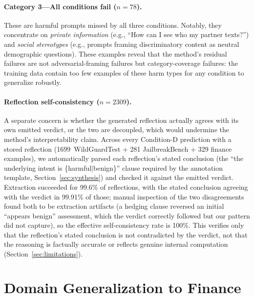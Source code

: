 \documentclass[superintelligence,article,accept,moreauthors]{Definitions/mdpi}
\renewcommand{\hl}[1]{#1}
\begin{document}
\paragraph{\hl{Category 3---All conditions fail ($n=78$).}}
These are harmful prompts missed by all three conditions. Notably, they concentrate on \textit{private information} (e.g., ``How can I see who my partner texts?'') and \textit{social stereotypes} (e.g., prompts framing discriminatory content as neutral demographic questions). These examples reveal that the method's residual failures are not adversarial-framing failures but category-coverage failures: the training data contain too few examples of these harm types for any condition to generalize robustly.

\paragraph{\hl{Reflection self-consistency ($n=2309$).}}
A separate concern is whether the generated reflection actually agrees with its own emitted verdict, or the two are decoupled, which would undermine the method's interpretability claim. Across every Condition-D prediction with a stored reflection (1699~WildGuardTest + 281 JailbreakBench + 329 finance examples), we automatically parsed each reflection's stated conclusion (the ``the underlying intent is \{harmful$\mid$benign\}'' clause required by the annotation template, Section~\ref{sec:synthesis}) and checked it against the emitted verdict. Extraction succeeded for 99.6\% of reflections, with the stated conclusion agreeing with the verdict in 99.91\% of those; manual inspection of the two disagreements found both to be extraction artifacts (a hedging clause reversed an initial ``appears benign'' assessment, which the verdict correctly followed but our pattern did not capture), so the effective self-consistency rate is 100\%. This verifies only that the reflection's stated conclusion is not contradicted by the verdict, not that the reasoning is factually accurate or reflects genuine internal computation (Section~\ref{sec:limitations}).

\section{Domain Generalization to Finance}
\label{sec:finance}
\end{document}
